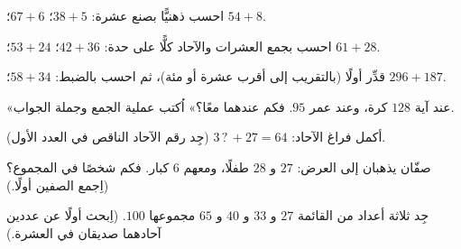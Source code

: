\begin{exercise}[$\star$]\label{exo:g2:addition:4}
احسب ذهنيًّا بصنع عشرة: $38 + 5$؛ \quad $67 + 6$؛
\quad $54 + 8$.
\end{exercise}

\begin{exercise}[$\star$]\label{exo:g2:addition:5}
احسب بجمع العشرات والآحاد كلًّا على حدة: $42 + 36$؛ \quad
$53 + 24$؛ \quad $61 + 28$.
\end{exercise}

\begin{exercise}[$\star$]\label{exo:g2:addition:6}
قدِّر أولًا (بالتقريب إلى أقرب عشرة أو مئة)، ثم احسب
بالضبط: $58 + 34$؛ \quad $296 + 187$.
\end{exercise}

\begin{exercise}[$\star$]\label{exo:g2:addition:7}
«عند آية $128$ كرة، وعند عمر $95$. فكم عندهما معًا؟» اُكتب
عملية الجمع وجملة الجواب.
\end{exercise}

\begin{exercise}[$\star$]\label{exo:g2:addition:8}
أكمل فراغ الآحاد: $3\,?\, + 27 = 64$ (جِد رقم الآحاد الناقص
في العدد الأول).
\end{exercise}

\begin{exercise}[$\star$]\label{exo:g2:addition:9}
صفّان يذهبان إلى العرض: $27$ و $28$ طفلًا، ومعهم $6$
كبار. فكم شخصًا في المجموع؟ (اِجمع الصفين أولًا.)
\end{exercise}

\begin{exercise}[$\star\star$]\label{exo:g2:addition:10}
جِد ثلاثة أعداد من القائمة $27$ و $33$ و $40$ و $65$ مجموعها
$100$. (اِبحث أولًا عن عددين آحادهما صديقان في العشرة.)
\end{exercise}
